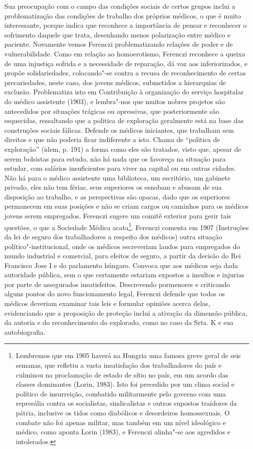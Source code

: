 Sua preocupação com o campo das condições sociais de certos grupos
inclui a problematização das condições de trabalho dos próprios médicos,
o que é muito interessante, porque indica que reconhece a importância de
pensar e reconhecer o sofrimento daquele que trata, desenhando menos
polarização entre médico e paciente. Novamente vemos Ferenczi
problematizando relações de poder e de vulnerabilidade. Como em relação
ao homoerotismo, Ferenczi reconhece a queixa de uma injustiça sofrida e
a necessidade de reparação, dá voz aos inferiorizados, e propõe
solidariedades, colocando"-se contra a recusa de reconhecimento de certas
precariedades, neste caso, dos jovens médicos, submetidos a hierarquias
de exclusão. Problematiza isto em Contribuição à organização do serviço
hospitalar do médico assistente (1903), e lembra"-nos que muitos nobres
projetos são antecedidos por situações trágicas ou opressivas, que
posteriormente são esquecidas, ressaltando que a politica de exploração
geralmente está na base das construções sociais fálicas. Defende os
médicos iniciantes, que trabalham sem direitos e que não poderia ficar
indiferente a isto. Chama de ``politica de exploração'' (idem, p. 191) a
forma como eles são tratados, visto que, apesar de serem bolsistas para
estudo, não há nada que os favoreça na situação para estudar, com
salários insuficientes para viver na capital ou em outras cidades. Não
há para o médico assistente uma biblioteca, um escritório, um gabinete
privado, eles não tem férias, seus superiores os esnobam e abusam de sua
disposição ao trabalho, e as perspectivas são opacas, dado que os
superiores permanecem em suas posições e não se criam cargos ou caminhos
para os médicos jovens serem empregados. Ferenczi sugere um comitê
exterior para gerir tais questões, o que a Sociedade Médica
acata\footnote{Lembremos que em 1905 haverá na Hungria uma famosa greve
  geral de seis semanas, que refletiu a vasta insatisfação dos
  trabalhadores do país e culminou na proclamação de estado de sítio no
  país, em um acordo das classes dominantes (Lorin, 1983). Isto foi
  precedido por um clima social e político de insurreição, combatido
  militarmente pelo governo com uma represália contra os socialistas,
  sindicalistas e outros supostos traidores da pátria, inclusive os
  tidos como diabólicos e desordeiros homossexuais. O combate não foi
  apenas militar, mas também em um nível ideológico e médico, como
  aponta Lorin (1983), e Ferenczi alinha"-se aos agredidos e intolerados.}.
Ferenczi comenta em 1907 (Instruções da lei de seguro dos trabalhadores
a respeito dos médicos) outra situação político"-institucional, onde os
médicos escreveriam laudos para empregados do mundo industrial e
comercial, para efeitos de seguro, a partir da decisão do Rei Francisco
Jose I e do parlamento húngaro. Convoca que aos médicos seja dada
autoridade pública, sem o que certamente estariam expostos a insultos e
injurias por parte de assegurados insatisfeitos. Descrevendo pormenores
e criticando alguns pontos do novo funcionamento legal, Ferenczi defende
que todos os médicos deveriam examinar tais leis e formular opiniões
acerca delas, evidenciando que a proposição de proteção inclui a
ativação da dimensão pública, da autoria e do reconhecimento do
explorado, como no caso da Srta. K e sua autobiografia.

